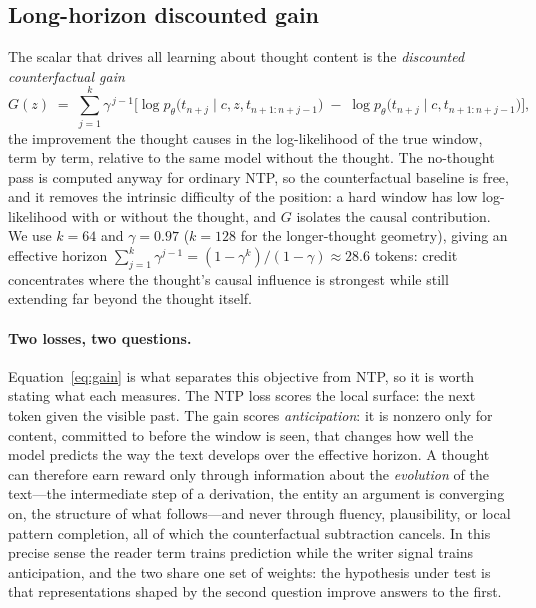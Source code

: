 \documentclass{article} %
\newcommand{\ctx}{c}
\newcommand{\thought}{z}
\newcommand{\reader}{p_\theta}
\newcommand{\gain}{G}
\begin{document}
\subsection{Long-horizon discounted gain}
\label{sec:gain}

The scalar that drives all learning about thought content is the \emph{discounted counterfactual gain}
\begin{equation}
    \gain(\thought) \;=\; \sum_{j=1}^{k} \gamma^{\,j-1} \Big[ \log \reader\big(t_{n+j} \mid \ctx, \thought, t_{n+1:n+j-1}\big) \;-\; \log \reader\big(t_{n+j} \mid \ctx, t_{n+1:n+j-1}\big) \Big],
    \label{eq:gain}
\end{equation}
the improvement the thought causes in the log-likelihood of the true window, term by term, relative to the same model without the thought. The no-thought pass is computed anyway for ordinary NTP, so the counterfactual baseline is free, and it removes the intrinsic difficulty of the position: a hard window has low log-likelihood with or without the thought, and $\gain$ isolates the causal contribution. We use $k = 64$ and $\gamma = 0.97$ ($k=128$ for the longer-thought geometry), giving an effective horizon $\sum_{j=1}^{k}\gamma^{j-1} = (1-\gamma^{k})/(1-\gamma) \approx 28.6$ tokens: credit concentrates where the thought's causal influence is strongest while still extending far beyond the thought itself.

\paragraph{Two losses, two questions.}
Equation~\eqref{eq:gain} is what separates this objective from NTP, so it is worth stating what each measures. The NTP loss scores the local surface: the next token given the visible past. The gain scores \emph{anticipation}: it is nonzero only for content, committed to before the window is seen, that changes how well the model predicts the way the text develops over the effective horizon. A thought can therefore earn reward only through information about the \emph{evolution} of the text---the intermediate step of a derivation, the entity an argument is converging on, the structure of what follows---and never through fluency, plausibility, or local pattern completion, all of which the counterfactual subtraction cancels. In this precise sense the reader term trains prediction while the writer signal trains anticipation, and the two share one set of weights: the hypothesis under test is that representations shaped by the second question improve answers to the first.
\end{document}
